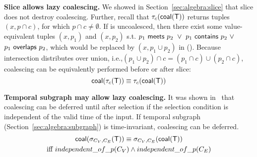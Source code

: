 \eat{\begin{equation}
\cl(\cl(\ttt)) \equiv \cl(\ttt)
\label{rul:twice}
\end{equation}}





{\bf Slice allows lazy coalescing.}  We showed in
Section~\ref{sec:algebra:slice} that slice does not destroy
coalescing.  Further, recall that $\tau_c(\textsf{coal}(\mathsf{T}))$ returns tuples
$(x,p \cap c)$, for which $p \cap c \neq \emptyset$.  If \ttt is
uncoalesced, then there exist some value-equivalent tuples $(x, p_1)$
and $(x, p_2)$
s.t. $p_1~\mathsf{meets}~p_2~\lor~p_1~\mathsf{contains}~p_2~\lor$\\$p_1~\mathsf{overlaps}~p_2$,
which would be replaced by $(x, p_1 \cup p_2)$ in \cl(\ttt).  Because
intersection distributes over union, i.e.,$(p_1 \cup p_2) \cap c =
(p_1 \cap c) \cup (p_2 \cap c)$, coalescing can be equivalently
performed before or after slice: 
\begin{equation}
\textsf{coal}(\tau_c(\mathsf{T})) \equiv \tau_c(\textsf{coal}(\mathsf{T}))
\label{rul:slice}
\end{equation}

{\bf Temporal subgraph may allow lazy coalescing.} It was shown
in~\cite{DBLP:conf/vldb/BohlenSS96} that coalescing can be deferred
until after selection if the selection condition is independent of the
valid time of the input. If temporal subgraph
(Section~\ref{sec:algebra:subgraph}) is time-invariant, coalescing can
be deferred.  
\begin{multline}
\textsf{coal}(\sigma_{C_V,C_E}(\mathsf{T})) \equiv \sigma_{C_V,C_E}(\textsf{coal}(\mathsf{T}))\\ \text{iff } independent\_of\_p(C_V) \wedge independent\_of\_p(C_E)
\label{rul:subgraphve}
\end{multline}

